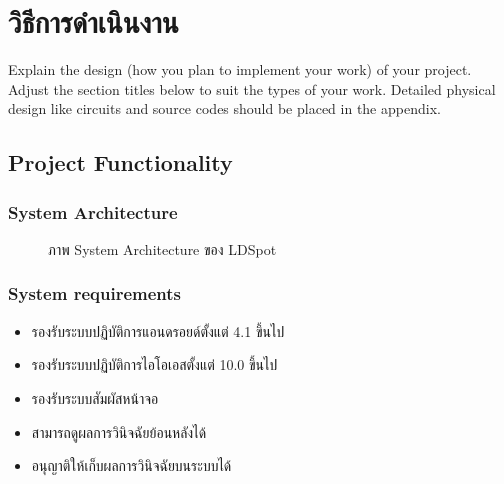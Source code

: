 \documentclass[12pt,oneside,openright,a4paper]{cpe-thai-project}
\begin{document}
\chapter{วิธีการดำเนินงาน}

Explain the design (how you plan to implement your work) of your project. Adjust the section titles below to suit the types of your work. Detailed physical design like circuits and source codes should be placed in the appendix.

\section{Project Functionality}
\subsection{System Architecture}
\begin{figure}[!ht]\centering
  \setlength{\fboxrule}{0.2mm} %
  \setlength{\fboxsep}{1cm}
  \caption{ภาพ System Architecture ของ LDSpot}\label{fig:system}
\end{figure}
\subsection{System requirements}
\begin{itemize}
  \item รองรับระบบปฏิบัติการแอนดรอยด์ตั้งแต่ 4.1 ขึ้นไป
  \item รองรับระบบปฏิบัติการไอโอเอสตั้งแต่ 10.0 ขึ้นไป
  \item รองรับระบบสัมผัสหน้าจอ
  \item สามารถดูผลการวินิจฉัยย้อนหลังได้
  \item อนุญาติให้เก็บผลการวินิจฉัยบนระบบได้
\end{itemize}
\end{document}
